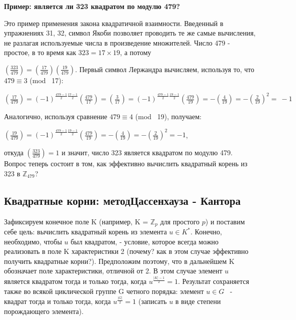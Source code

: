\begin{beznomera}
{\bf Пример: является ли 323 квадратом по модулю 479?}
\end{beznomera}

Это пример применения закона квадратичной взаимности. Введенный в упражнениях 31, 32, символ Якоби позволяет проводить те же самые вычисления, не разлагая используемые числа в произведение множителей. Число 479 - простое, в то время как $323 = 17\times 19$, а потому

\newpage


$(\frac{323}{479}) = (\frac{17}{479})(\frac{19}{479})$. Первый символ Лержандра вычисляем, используя то, что $479 \equiv 3$ (mod \ 17):

\begin{center}
$(\frac{17}{479}) = (-1)^{\frac{479-1}{2}\frac{17-1}{2}}(\frac{479}{17}) = (\frac{3}{17}) = (-1)^{\frac{479-1}{2}\frac{19-1}{2}}(\frac{479}{19}) = -(\frac{4}{19}) = -(\frac{2}{19})^2 = ~-1$
\end{center}

Аналогично, используя сравнение $479 \equiv 4$ (mod \ 19), получаем:

\begin{center}
$(\frac{19}{479}) = (-1)^{\frac{479-1}{2}\frac{19-1}{2}}(\frac{479}{19}) = -(\frac{4}{19}) = -(\frac{2}{19})^2 = -1$,
\end{center}

откуда $(\frac{323}{479}) = 1$
 и значит, число 323 является квадратом по модулю 479. Вопрос теперь состоит в том, как эффективно вычислить квадратный корень из 323 в $\mathbb{Z}_{479}$?


\subsection{Квадратные корни: метод\newline Цассенхауза - Кантора}


Зафиксируем конечное поле K (например, K = $\mathbb{Z}_p$
 для простого $p$) и поставим себе цель: вычислить квадратный корень из элемента $u \in K^*$. Конечно, необходимо, чтобы $u$
 был квадратом, - условие, которое всегда можно реализовать в поле K характеристики 2 (почему? как в этом случае эффективно получить квадратные корни?). Предположим поэтому, что в дальнейшем K обозначает поле характеристики, отличной от 2. В этом случае элемент $u$ является квадратом тогда и только тогда, когда $u^{\frac{|K|-1}{2}} = 1$. Результат сохраняется также во всякой циклической группе G четного порядка: элемент $u \in G$
 ~- квадрат тогда и только тогда, когда $u^{\frac{|G|}{2}} = 1$
 (записать $u$
 в виде степени порождающего элемента).

